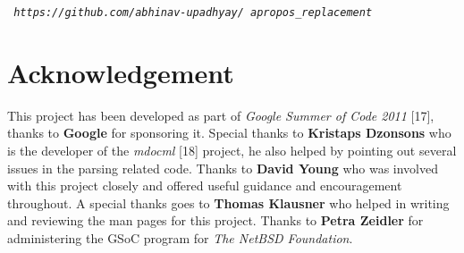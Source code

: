 \documentclass[letterpaper,twocolumn,10pt]{article}
\begin{document}
{\tt
 \emph{https://github.com/abhinav-upadhyay/
 apropos\_replacement}
}

\section{Acknowledgement}
This project has been developed as part of \emph{Google Summer of Code 2011}
[17], thanks to \textbf{Google} for sponsoring it. Special thanks to
\textbf{Kristaps Dzonsons} who is the developer of the \textit{mdocml} [18]
project, he also helped by pointing out several issues in the parsing related
code. Thanks to \textbf{David Young} who was involved with
this project closely and offered useful guidance and encouragement throughout. A
special thanks goes to \textbf{Thomas Klausner} who helped in writing and
reviewing the man pages for this project. Thanks to \textbf{Petra Zeidler} for
administering the GSoC program for \textit{The NetBSD Foundation}. \\
\end{document}
